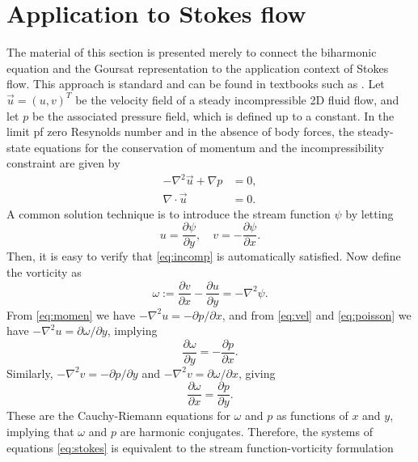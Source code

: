 
\section{Application to Stokes flow \label{sec:physics}}
The material of this section is presented merely to connect the biharmonic equation and the
Goursat representation to the application context of Stokes flow. This approach is standard and can be found in textbooks such as \cite{ockendon}. Let $\vec{u}=(u,v)^T$ be the velocity field of a steady incompressible 2D fluid flow, and let $p$ be the associated pressure field, which is defined up to a constant. In the limit pf zero Resynolds number and in the absence of body forces, the steady-state equations for the conservation of momentum and the incompressibility constraint are given by
\begin{subequations}\label{eq:stokes}
\begin{align}
-\nabla^2 \vec{u} + \nabla p &= 0,\label{eq:momen}\\
\nabla\cdot\vec{u} &= 0. \label{eq:incomp}
\end{align}
\end{subequations}
A common solution technique is to introduce the stream function $\psi$ by letting
\begin{equation}\label{eq:vel}
u=\frac{\partial\psi}{\partial y}, \quad 
v=-\frac{\partial\psi}{\partial x}.
\end{equation}
Then, it is easy to verify that \eqref{eq:incomp} is automatically satisfied. Now define the vorticity as
\begin{equation} \label{eq:poisson}
\omega := \frac{\partial v}{\partial x} - \frac{\partial u}{\partial y}  = -\nabla^2 \psi.
\end{equation}
From \eqref{eq:momen} we have $-\nabla^2 u = -\partial p/\partial x$, and from \eqref{eq:vel} and \eqref{eq:poisson} we have $-\nabla^2 u =\partial\omega/\partial y$, implying 
\begin{equation}
\frac{\partial \omega}{\partial y} = -\frac{\partial p}{\partial x}.
\end{equation}
Similarly, $-\nabla^2 v=-\partial p/\partial y$ and $-\nabla^2 v =\partial \omega/\partial x$, giving
\begin{equation}
\frac{\partial\omega}{\partial x}=\frac{\partial p}{\partial y}.
\end{equation}
These are the Cauchy-Riemann equations for $\omega$ and $p$ as functions of $x$ and $y$, implying that $\omega$ and $p$ are harmonic conjugates. Therefore, the systems of equations \eqref{eq:stokes} is equivalent to the stream function-vorticity formulation
